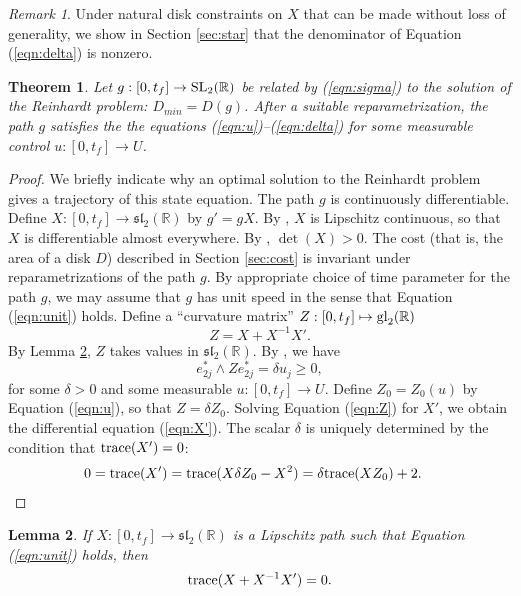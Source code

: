 \documentclass{article}
\newtheorem{theorem}{Theorem}[subsection]
\newtheorem{lemma}[theorem]{Lemma}
\theoremstyle{remark}
\newtheorem{remark}[equation]{Remark}%
\newcommand{\ring}[1]{\mathbb{#1}}
\newcommand{\op}[1]{\hbox{#1}}
\def\sl{\mathfrak{sl}_2(\ring{R})}
\def\SL{\op{SL}_2(\ring{R})}
\def\DR{D_{min}}
\newcommand\ee[1]{e_{#1}^*}
\begin{document}
\begin{remark}
  Under natural disk constraints on $X$ that can be made without
  loss of generality, we show in Section \ref{sec:star} that the
  denominator of Equation (\ref{eqn:delta}) is nonzero.
\end{remark}


\begin{theorem} Let $g:[0,t_f]\to \SL$ be related by (\ref{eqn:sigma}) to
the solution  of the Reinhardt problem: $\DR=D(g)$.
  After a suitable reparametrization, the path $g$ satisfies the the
  equations (\ref{eqn:u})--(\ref{eqn:delta}) for some measurable control
  $u:[0,t_f]\to U$.
\end{theorem}


\begin{proof}
  We briefly indicate why an optimal solution to the Reinhardt problem
  gives a trajectory of this state equation.  The path $g$ is
  continuously differentiable.  Define $X:[0,t_f]\to\sl$ by $g' = g
  X$.  By \cite[\S3.3]{hales2011reinhardt}, $X$ is Lipschitz
  continuous, so that $X$ is differentiable almost everywhere.  By
  \cite[\S3.5]{hales2011reinhardt}, $\det(X)>0$.  The cost (that is, the
 area of a disk $D$) described in
  Section
  \ref{sec:cost} is invariant under reparametrizations of the path
  $g$.  By appropriate choice of time parameter for the path $g$, we
  may assume that $g$ has unit speed in the sense that Equation
  (\ref{eqn:unit}) holds.  Define a ``curvature matrix''
  $Z:[0,t_f]\mapsto\op{gl}_2(\ring{R})$
\begin{equation}\label{eqn:Z}
Z = X + X^{-1}X'.
\end{equation}
By Lemma \ref{lemma:trace0}, $Z$ takes values in $\sl$.  By
\cite[Eqn.19]{hales2011reinhardt}, we have
\begin{equation}
\ee{2j} \wedge Z \ee{2j} = \delta u_j \ge 0,
\end{equation}
for some $\delta>0$ and some measurable $u:[0,t_f]\to U$.  Define
$Z_0=Z_0(u)$ by Equation (\ref{eqn:u}), so that $Z = \delta Z_0$.  Solving
Equation (\ref{eqn:Z}) for $X'$, we obtain the differential equation
(\ref{eqn:X'}).  The scalar $\delta$ is uniquely determined by the
condition that $\op{trace}(X')=0$:
\begin{align*}
0 &= \op{trace}(X') = 
\op{trace}(X \delta Z_0-X^2) = \delta\op{trace}(X Z_0) +2.
\end{align*}
\end{proof}

\begin{lemma}\label{lemma:trace0} 
  If $X:[0,t_f]\to \sl$ is a Lipschitz path such that Equation
  (\ref{eqn:unit}) holds, then
\[
\op{trace}(X + X^{-1} X') = 0.
\]
\end{lemma}
\end{document}

